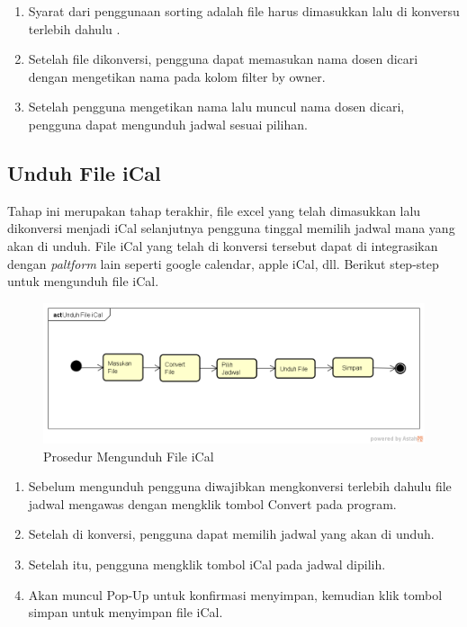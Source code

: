 \begin{enumerate}
	\item Syarat dari penggunaan sorting adalah file harus dimasukkan lalu di konversu terlebih dahulu .
	\item Setelah file dikonversi, pengguna dapat memasukan nama dosen dicari dengan mengetikan nama pada kolom filter by owner.
	\item Setelah pengguna mengetikan nama lalu muncul nama dosen dicari, pengguna dapat mengunduh jadwal sesuai pilihan.
\end{enumerate}

\subsection{Unduh File iCal}
Tahap ini merupakan tahap terakhir, file excel yang telah dimasukkan lalu dikonversi menjadi iCal selanjutnya pengguna tinggal memilih jadwal mana yang akan di unduh. File iCal yang telah di konversi tersebut dapat di integrasikan dengan \textit{paltform} lain seperti google calendar, apple iCal, dll. Berikut step-step untuk mengunduh file iCal.
\begin{figure}[h]
	\centering
	\includegraphics[scale=0.5]{Gambar/Unduh-File-iCal}
	\caption{Prosedur Mengunduh File iCal}
	\end{figure}

\begin{enumerate}
	\item Sebelum mengunduh pengguna diwajibkan mengkonversi terlebih dahulu file jadwal mengawas dengan mengklik tombol Convert pada program.
	\item Setelah di konversi, pengguna dapat memilih jadwal yang akan di unduh.
	\item Setelah itu, pengguna mengklik tombol iCal pada jadwal dipilih.
	\item Akan muncul Pop-Up untuk konfirmasi menyimpan, kemudian klik tombol simpan untuk menyimpan file iCal.
\end{enumerate}

